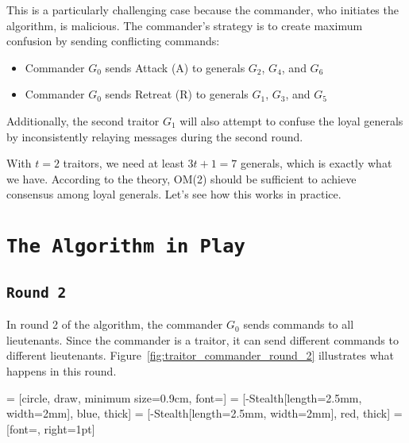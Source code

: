 \documentclass[11pt]{article}
\newcommand{\gen}[1]{\ensuremath{G_{#1}}}
\begin{document}
This is a particularly challenging case because the commander, who initiates the algorithm, is malicious. The commander's strategy is to create maximum confusion by sending conflicting commands:
\begin{itemize}
    \item Commander $G_0$ sends Attack (A) to generals $G_2$, $G_4$, and $G_6$
    \item Commander $G_0$ sends Retreat (R) to generals $G_1$, $G_3$, and $G_5$
\end{itemize}

Additionally, the second traitor $G_1$ will also attempt to confuse the loyal generals by inconsistently relaying messages during the second round.

With $t = 2$ traitors, we need at least $3t+1 = 7$ generals, which is exactly what we have. According to the theory, OM(2) should be sufficient to achieve consensus among loyal generals. Let's see how this works in practice.

\section*{\texttt{\Large The Algorithm in Play}}

\subsection*{\texttt{\large Round 2}}
\justifying
In round 2 of the algorithm, the commander $\gen{0}$ sends commands to all lieutenants. Since the commander is a traitor, it can send different commands to different lieutenants. Figure~\ref{fig:traitor_commander_round_2} illustrates what happens in this round.


 = [circle, draw, minimum size=0.9cm, font=\small]
 = [-{Stealth[length=2.5mm, width=2mm]}, blue, thick] %
 = [-{Stealth[length=2.5mm, width=2mm]}, red, thick]  %
 = [font=\scriptsize, right=1pt]
\end{document}
